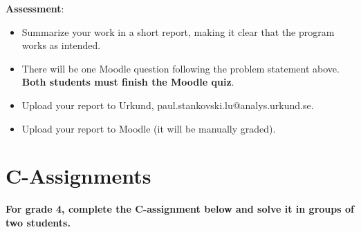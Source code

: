 \documentclass{article}
\begin{document}
\begin{description}
{				\textbf{Assessment}:
				\begin{itemize}
					\item Summarize your work in a short report, making it clear that the program works as intended.
					
					\item There will be one Moodle question following the problem statement above. 
					\textbf{Both students must finish the Moodle quiz}.
					
					\item Upload your report to Urkund, paul.stankovski.lu@analys.urkund.se.
					
					\item Upload your report to Moodle (it will be manually graded).
				\end{itemize}
			}
		\end{description}
		
		\clearpage
		
		\section*{C-Assignments}
		\textbf{For grade 4, complete the C-assignment below and solve it in groups of two students.}
		
\end{document}
